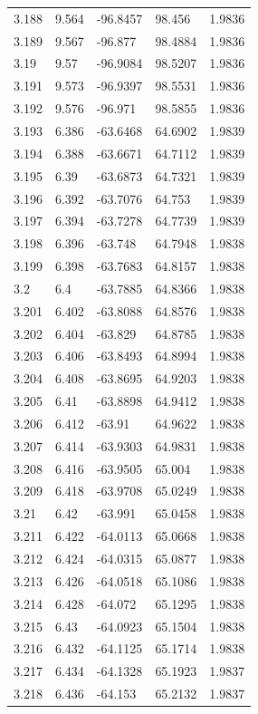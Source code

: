 \begin{tabular}{lllll}
3.188 & 9.564 & -96.8457 & 98.456 & 1.9836 \\
3.189 & 9.567 & -96.877 & 98.4884 & 1.9836 \\
3.19 & 9.57 & -96.9084 & 98.5207 & 1.9836 \\
3.191 & 9.573 & -96.9397 & 98.5531 & 1.9836 \\
3.192 & 9.576 & -96.971 & 98.5855 & 1.9836 \\
3.193 & 6.386 & -63.6468 & 64.6902 & 1.9839 \\
3.194 & 6.388 & -63.6671 & 64.7112 & 1.9839 \\
3.195 & 6.39 & -63.6873 & 64.7321 & 1.9839 \\
3.196 & 6.392 & -63.7076 & 64.753 & 1.9839 \\
3.197 & 6.394 & -63.7278 & 64.7739 & 1.9839 \\
3.198 & 6.396 & -63.748 & 64.7948 & 1.9838 \\
3.199 & 6.398 & -63.7683 & 64.8157 & 1.9838 \\
3.2 & 6.4 & -63.7885 & 64.8366 & 1.9838 \\
3.201 & 6.402 & -63.8088 & 64.8576 & 1.9838 \\
3.202 & 6.404 & -63.829 & 64.8785 & 1.9838 \\
3.203 & 6.406 & -63.8493 & 64.8994 & 1.9838 \\
3.204 & 6.408 & -63.8695 & 64.9203 & 1.9838 \\
3.205 & 6.41 & -63.8898 & 64.9412 & 1.9838 \\
3.206 & 6.412 & -63.91 & 64.9622 & 1.9838 \\
3.207 & 6.414 & -63.9303 & 64.9831 & 1.9838 \\
3.208 & 6.416 & -63.9505 & 65.004 & 1.9838 \\
3.209 & 6.418 & -63.9708 & 65.0249 & 1.9838 \\
3.21 & 6.42 & -63.991 & 65.0458 & 1.9838 \\
3.211 & 6.422 & -64.0113 & 65.0668 & 1.9838 \\
3.212 & 6.424 & -64.0315 & 65.0877 & 1.9838 \\
3.213 & 6.426 & -64.0518 & 65.1086 & 1.9838 \\
3.214 & 6.428 & -64.072 & 65.1295 & 1.9838 \\
3.215 & 6.43 & -64.0923 & 65.1504 & 1.9838 \\
3.216 & 6.432 & -64.1125 & 65.1714 & 1.9838 \\
3.217 & 6.434 & -64.1328 & 65.1923 & 1.9837 \\
3.218 & 6.436 & -64.153 & 65.2132 & 1.9837 \\

\end{tabular}
